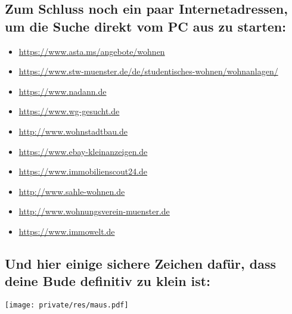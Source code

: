 \begin{multicols*}{2}
\subsection*{Zum Schluss noch ein paar Internetadressen, um die Suche direkt vom PC aus zu starten:}
\vspace{-1ex}
\begin{itemize}[leftmargin=0.8cm]
	\raggedright
	\item \url{https://www.asta.ms/angebote/wohnen}
        \item \url{https://www.stw-muenster.de/de/studentisches-wohnen/wohnanlagen/}
	\item \url{https://www.nadann.de}
	\item \url{https://www.wg-gesucht.de}
	\item \url{http://www.wohnstadtbau.de}
	\item \url{https://www.ebay-kleinanzeigen.de}
	\item \url{https://www.immobilienscout24.de}
	\item \url{http://www.sahle-wohnen.de}
	\item \url{http://www.wohnungsverein-muenster.de}
	\item \url{https://www.immowelt.de}
\end{itemize}

\vspace{-2ex}
\subsection*{Und hier einige sichere Zeichen dafür, dass deine Bude definitiv zu klein ist:}
\hspace{1.5cm}\texttt{[image: private/res/maus.pdf]}

\vspace{-\parskip}\vspace{-0.1cm}
\setlength{\fboxsep}{0.2cm}

\end{multicols*}
